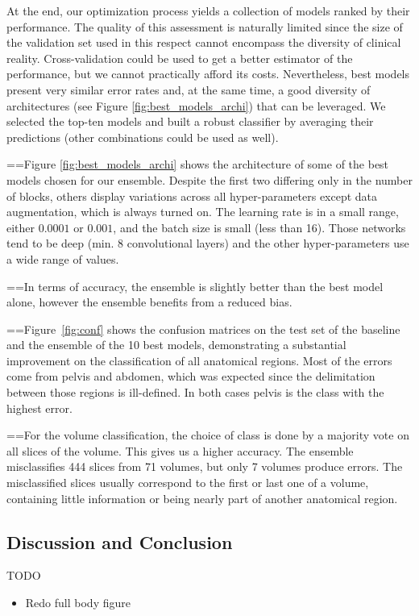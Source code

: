 At the end, our optimization process yields a collection of models ranked by their performance. The quality of this assessment is naturally limited since the size of the validation set used in this respect cannot encompass the diversity of clinical reality. Cross-validation could be used to get a better estimator of the performance, but we cannot practically afford its costs. Nevertheless, best models present very similar error rates and, at the same time, a good diversity of architectures (see Figure \ref{fig:best_models_archi}) that can be leveraged. We selected the top-ten models and built a robust classifier by averaging their predictions (other combinations could be used as well).

==Figure \ref{fig:best_models_archi} shows the architecture of some of the best models chosen for our ensemble. Despite the first two differing only in the number of blocks, others display variations across all hyper-parameters except data augmentation, which is always turned on. The learning rate is in a small range, either $0.0001$ or $0.001$, and the batch size is small (less than 16). Those networks tend to be deep (min. 8 convolutional layers) and the other hyper-parameters use a wide range of values.

==In terms of accuracy, the ensemble is slightly better than the best model alone, however the ensemble benefits from a reduced bias.

==Figure~\ref{fig:conf} shows the confusion matrices on the test set of the baseline and the ensemble of the 10 best models, demonstrating a substantial improvement on the classification of all anatomical regions. Most of the errors come from pelvis and abdomen, which was expected since the delimitation between those regions is ill-defined. In both cases pelvis is the class with the highest error.

==For the volume classification, the choice of class is done by a majority vote on all slices of the volume. This gives us a higher accuracy. The ensemble misclassifies 444 slices from 71 volumes, but only 7 volumes produce errors. The misclassified slices usually correspond to the first or last one of a volume, containing little information or being nearly part of another anatomical region.

\subsection{Discussion and Conclusion}

TODO
\begin{itemize}
    \item Redo full body figure
\end{itemize}

